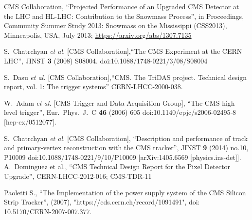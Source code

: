 \begin{thebibliography}{1}
 CMS Collaboration, ``Projected Performance of an Upgraded CMS Detector at the LHC and HL-LHC: Contribution to the Snowmass Process'', in Proceedings, Community Summer Study 2013: Snowmass on the Mississippi (CSS2013), Minneapolis, USA, July 2013; \url{https://arxiv.org/abs/1307.7135}

%
 S.~Chatrchyan {\it et al.} [CMS Collaboration],``The CMS Experiment at the CERN LHC'', JINST {\bf 3} (2008) S08004. doi:10.1088/1748-0221/3/08/S08004

  S.~Dasu {\it et al.} [CMS Collaboration],``CMS. The TriDAS project. Technical design report, vol. 1: The trigger systems'' CERN-LHCC-2000-038.

  W.~Adam {\it et al.} [CMS Trigger and Data Acquisition Group], ``The CMS high level trigger'',  Eur.\ Phys.\ J.\ C {\bf 46} (2006) 605 doi:10.1140/epjc/s2006-02495-8 [hep-ex/0512077].


  S.~Chatrchyan {\it et al.} [CMS Collaboration], ``Description and performance of track and primary-vertex reconstruction with the CMS tracker'', JINST {\bf 9} (2014) no.10,  P10009 doi:10.1088/1748-0221/9/10/P10009  [arXiv:1405.6569 [physics.ins-det]].
  \\


 A.~Dominguez et al., ``CMS Technical Design Report
  for the Pixel Detector Upgrade'', CERN-LHCC-2012-016; CMS-TDR-11

 Paoletti S., ``The Implementation of the power supply system of the CMS Silicon Strip Tracker'', (2007), "https://cds.cern.ch/record/1091491", doi: 10.5170/CERN-2007-007.377.


\end{thebibliography}
